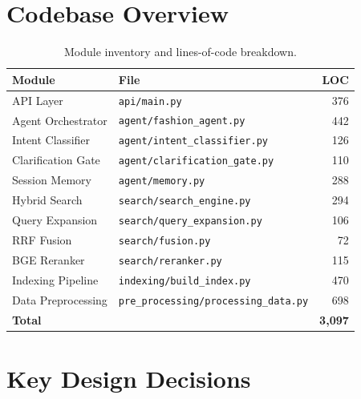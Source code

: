 \documentclass[12pt,a4paper]{article}
\begin{document}
\section{Codebase Overview}
\label{sec:codebase}

\begin{table}[H]
\centering
\begin{tabular}{llr}
\toprule
\textbf{Module} & \textbf{File} & \textbf{LOC} \\
\midrule
API Layer         & \texttt{api/main.py}                         & 376 \\
Agent Orchestrator& \texttt{agent/fashion\_agent.py}             & 442 \\
Intent Classifier & \texttt{agent/intent\_classifier.py}         & 126 \\
Clarification Gate& \texttt{agent/clarification\_gate.py}        & 110 \\
Session Memory    & \texttt{agent/memory.py}                     & 288 \\
Hybrid Search     & \texttt{search/search\_engine.py}            & 294 \\
Query Expansion   & \texttt{search/query\_expansion.py}          & 106 \\
RRF Fusion        & \texttt{search/fusion.py}                    &  72 \\
BGE Reranker      & \texttt{search/reranker.py}                  & 115 \\
Indexing Pipeline & \texttt{indexing/build\_index.py}            & 470 \\
Data Preprocessing& \texttt{pre\_processing/processing\_data.py} & 698 \\
\midrule
\textbf{Total}    &                                              & \textbf{3{,}097} \\
\bottomrule
\end{tabular}
\caption{Module inventory and lines-of-code breakdown.}
\label{tab:codebase}
\end{table}

\section{Key Design Decisions}
\label{sec:design}
\end{document}
